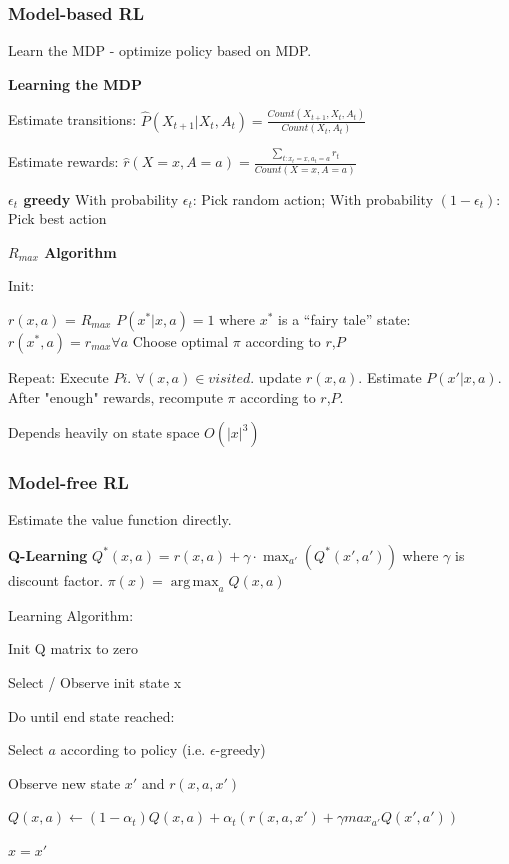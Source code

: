\documentclass[a4paper, 11pt, landscape]{article}
\DeclareMathOperator*{\argmax}{arg\,max}
\begin{document}
\begin{multicols*}{3}
\subsubsection{Model-based RL }
Learn the MDP - optimize policy based on MDP.

\textbf{Learning the MDP}

Estimate transitions: $\hat{P}(X_{t+1} | X_t, A_t) = \frac{Count(X_{t+1}, X_t, A_t)}{Count(X_t, A_t)}$

Estimate rewards: $\hat{r}(X=x, A= a) = \frac{\sum_{t: x_t = x, a_t = a} r_t}{Count(X = x, A = a)}$

\textbf{ $\epsilon_t$ greedy}
With probability  $\epsilon_t$: Pick random action; With probability $(1- \epsilon_t)$: Pick best action

\textbf{$R_{max}$ Algorithm}

Init:

$r(x, a)$ = $R_{max}$
$P(x^* | x, a) = 1$ where $x^*$ is a “fairy tale” state: $r(x^*, a) = r_{max}  \forall a$
Choose optimal $\pi$ according to $r$,$P$

Repeat:
Execute $Pi$. $\forall(x,a)\in visited$. update $r(x,a)$. Estimate $P(x'|x,a)$.
After "enough" rewards, recompute $\pi$ according to $r$,$P$.

Depends heavily on state space $O(|x|^3)$


\subsubsection{Model-free RL}
Estimate the value function directly.

\textbf{Q-Learning}
$Q^*(x, a) = r(x, a) + \gamma \cdot \max_{a'} (Q^*(x', a'))$ where $\gamma$ is discount factor. $\pi(x) = \argmax_a Q(x, a )$

Learning Algorithm:
\begin{compactitem}
	\item Init Q matrix to zero
	\item Select / Observe init state x
	\item Do until end state reached:
	\item Select $a$ according to policy (i.e. $\epsilon$-greedy)
	\item Observe new state $x'$ and $r(x,a,x')$
	\item $Q(x, a) \leftarrow (1-\alpha_t)Q(x, a)  + \alpha_t(r(x,a,x') + \gamma max_{a'}Q(x',a'))$
	\item $x = x'$
\end{compactitem}


\end{multicols*}
\end{document}
